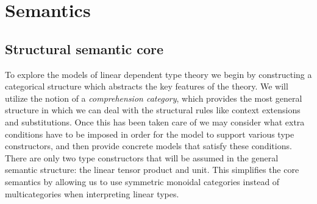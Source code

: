 \section{Semantics}\label{semantics}
\subsection{Structural semantic core}
To explore the models of linear dependent type theory we begin by constructing a categorical structure which abstracts the key features of the theory. We will utilize the notion of a \textit{comprehension category}, which provides the most general structure in which we can deal with the structural rules like context extensions and substitutions. Once this has been taken care of we may consider what extra conditions have to be imposed in order for the model to support various type constructors, and then provide concrete models that satisfy these conditions.\\

There are only two type constructors that will be assumed in the general semantic structure: the linear tensor product and unit. This simplifies the core semantics by allowing us to use symmetric monoidal categories instead of multicategories when interpreting linear types.

